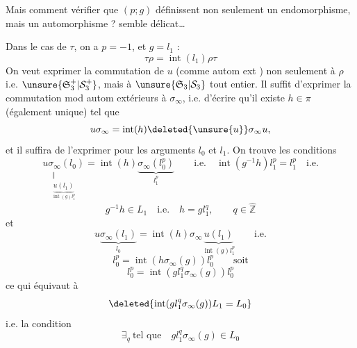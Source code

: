 Mais comment vérifier que $(p;g)$ définissent non seulement un endomorphisme, mais un automorphisme ?  semble délicat\ldots

Dans le cas de $\tau$, on a $p=-1$, et $g=l_1$ :
\[
\tau\rho=\operatorname{int}(l_1)\rho\tau
\]
On veut exprimer la commutation de $u$ (comme autom ext ) non seulement à $\rho$ i.e. $\unsure{\mathfrak S_3^+|\mathcal S_3^+}$, mais à $\unsure{\mathfrak S_3|\mathcal S_3}$ tout entier. Il suffit d'exprimer la commutation mod autom extérieurs à $\sigma_\infty$, i.e. d'écrire qu'il existe $h\in\pi$ (également unique) tel que
\[
u\sigma_\infty=\operatorname{int}(h)\deleted{\unsure{u}}\sigma_\infty u,
\]
et il suffira de l'exprimer pour les arguments $l_0$ et $l_1$. On trouve les conditions
\[
\underset{\substack{\Vert\\\underbrace{u(l_1)}_{\operatorname{int}(g)l_1^p}}}{u\sigma_\infty(l_0)}=\operatorname{int}(h)\underbrace{\sigma_\infty(l_0^p)}_{l_1^p}
\qquad\text{i.e.}\quad\operatorname{int}(g^{-1}h)l_1^p=l_1^p\quad\text{i.e.}
\]
\[
g^{-1}h\in L_1\quad\text{i.e.}\quad h=gl_1^{q},\qquad q\in\hat{\mathbb Z}
\]
et
\[
u\underbrace{\sigma_\infty(l_1)}_{l_0}=\operatorname{int}(h)\sigma_\infty\underbrace{u(l_1)}_{\operatorname{int}(g)l_1^p}\qquad\text{i.e.}
\]
\[
l_0^p=\operatorname{int}(h\sigma_\infty(g))l_0^p\qquad\text{soit}
\]
\[
l_0^p=\operatorname{int}(gl_1^q\sigma_\infty(g))l_0^p
\]
ce qui équivaut à
\[
\deleted{\operatorname{int}(gl_1^q\sigma_\infty(g))L_1=L_0}
\]
i.e. la condition
\[
\exists_q\ \text{tel que}\quad gl_1^q\sigma_\infty(g)\in L_0
\]

